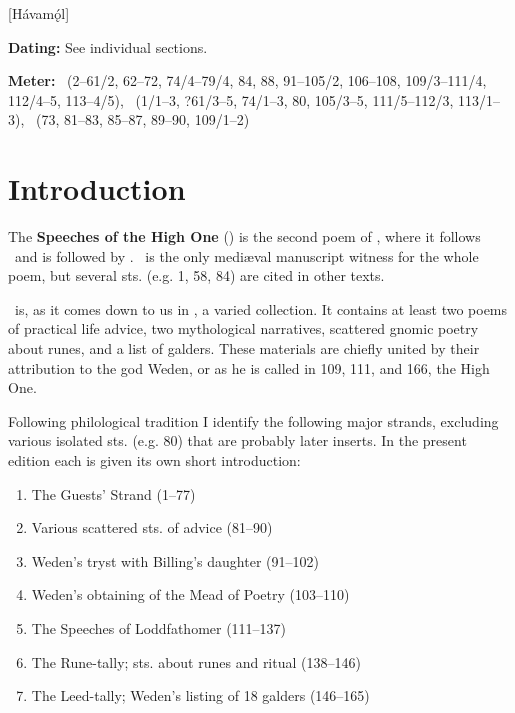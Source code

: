 [Hávamǫ́l]
\def\thisBookCode{Havamal}

\begin{flushright}%
\textbf{Dating:} See individual sections.

\textbf{Meter:} \Ljodahattr\ (2–61/2, 62–72, 74/4–79/4, 84, 88, 91–105/2, 106–108, 109/3–111/4, 112/4–5, 113–4/5), \Galdralag\ (1/1–3, ?61/3–5, 74/1–3, 80, 105/3–5, 111/5–112/3, 113/1–3), \Malahattr\ (73, 81–83, 85–87, 89–90, 109/1–2)
\end{flushright}%

\section{Introduction}

The \textbf{Speeches of the High One} (\Havamal) is the second poem of \Regius, where it follows \Voluspa\ and is followed by \Vafthrudnismal.  \Regius\ is the only mediæval manuscript witness for the whole poem, but several sts. (e.g. 1, 58, 84) are cited in other texts.

\Havamal\ is, as it comes down to us in \Regius, a varied collection.  It contains at least two poems of practical life advice, two mythological narratives, scattered gnomic poetry about runes, and a list of galders.  These materials are chiefly united by their attribution to the god Weden, or as he is called in 109, 111, and 166, the High One.

Following philological tradition I identify the following major strands, excluding various isolated sts. (e.g. 80) that are probably later inserts.  In the present edition each is given its own short introduction:

\begin{enumerate}
	\item The Guests’ Strand (1–77)
  \item Various scattered sts. of advice (81–90)
  \item Weden’s tryst with Billing’s daughter (91–102)
  \item Weden’s obtaining of the Mead of Poetry (103–110)
  \item The Speeches of Loddfathomer (111–137)
  \item The Rune-tally; sts. about runes and ritual (138–146)
  \item The Leed-tally; Weden’s listing of 18 galders (146–165)
\end{enumerate}

